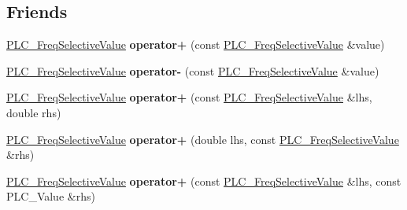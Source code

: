 \subsection*{\-Friends}
\begin{DoxyCompactItemize}
\item 
\hypertarget{classns3_1_1PLC__FreqSelectiveValue_ad5c6493d7db869cd9fe57030af23e55a}{\hyperlink{classns3_1_1PLC__FreqSelectiveValue}{\-P\-L\-C\-\_\-\-Freq\-Selective\-Value} {\bfseries operator+} (const \hyperlink{classns3_1_1PLC__FreqSelectiveValue}{\-P\-L\-C\-\_\-\-Freq\-Selective\-Value} \&value)}\label{classns3_1_1PLC__FreqSelectiveValue_ad5c6493d7db869cd9fe57030af23e55a}

\item 
\hypertarget{classns3_1_1PLC__FreqSelectiveValue_a7666b9bb25ab1c3ca75a51aafb06a9d3}{\hyperlink{classns3_1_1PLC__FreqSelectiveValue}{\-P\-L\-C\-\_\-\-Freq\-Selective\-Value} {\bfseries operator-\/} (const \hyperlink{classns3_1_1PLC__FreqSelectiveValue}{\-P\-L\-C\-\_\-\-Freq\-Selective\-Value} \&value)}\label{classns3_1_1PLC__FreqSelectiveValue_a7666b9bb25ab1c3ca75a51aafb06a9d3}

\item 
\hypertarget{classns3_1_1PLC__FreqSelectiveValue_ad1ebcf46751305234af9864542a2d9c9}{\hyperlink{classns3_1_1PLC__FreqSelectiveValue}{\-P\-L\-C\-\_\-\-Freq\-Selective\-Value} {\bfseries operator+} (const \hyperlink{classns3_1_1PLC__FreqSelectiveValue}{\-P\-L\-C\-\_\-\-Freq\-Selective\-Value} \&lhs, double rhs)}\label{classns3_1_1PLC__FreqSelectiveValue_ad1ebcf46751305234af9864542a2d9c9}

\item 
\hypertarget{classns3_1_1PLC__FreqSelectiveValue_a81cd52d9418c80533c4591858fe73c4f}{\hyperlink{classns3_1_1PLC__FreqSelectiveValue}{\-P\-L\-C\-\_\-\-Freq\-Selective\-Value} {\bfseries operator+} (double lhs, const \hyperlink{classns3_1_1PLC__FreqSelectiveValue}{\-P\-L\-C\-\_\-\-Freq\-Selective\-Value} \&rhs)}\label{classns3_1_1PLC__FreqSelectiveValue_a81cd52d9418c80533c4591858fe73c4f}

\item 
\hypertarget{classns3_1_1PLC__FreqSelectiveValue_af2725f6e24032e2afe17930d39f6457d}{\hyperlink{classns3_1_1PLC__FreqSelectiveValue}{\-P\-L\-C\-\_\-\-Freq\-Selective\-Value} {\bfseries operator+} (const \hyperlink{classns3_1_1PLC__FreqSelectiveValue}{\-P\-L\-C\-\_\-\-Freq\-Selective\-Value} \&lhs, const \-P\-L\-C\-\_\-\-Value \&rhs)}\label{classns3_1_1PLC__FreqSelectiveValue_af2725f6e24032e2afe17930d39f6457d}


\end{DoxyCompactItemize}
